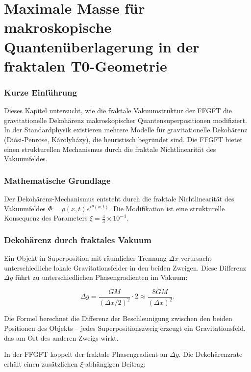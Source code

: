\chapter{Maximale Masse für makroskopische Quantenüberlagerung in der fraktalen T0-Geometrie}


	
	\subsection*{Kurze Einführung}
	
	Dieses Kapitel untersucht, wie die fraktale Vakuumstruktur der FFGFT die gravitationelle Dekohärenz makroskopischer Quantensuperpositionen modifiziert. In der Standardphysik existieren mehrere Modelle für gravitationelle Dekohärenz (Diósi-Penrose, Károlyházy), die heuristisch begründet sind. Die FFGFT bietet einen strukturellen Mechanismus durch die fraktale Nichtlinearität des Vakuumfeldes.
	
	\subsection*{Mathematische Grundlage}
	
	Der Dekohärenz-Mechanismus entsteht durch die fraktale Nichtlinearität des Vakuumfeldes \(\Phi = \rho(x,t) e^{i\theta(x,t)}\). Die Modifikation ist eine strukturelle Konsequenz des Parameters \(\xi = \frac{4}{3} \times 10^{-4}\).
	

	
	\subsection*{Dekohärenz durch fraktales Vakuum}
	
	Ein Objekt in Superposition mit räumlicher Trennung \(\Delta x\) verursacht unterschiedliche lokale Gravitationsfelder in den beiden Zweigen. Diese Differenz \(\Delta g\) führt zu unterschiedlichen Phasengradienten im Vakuum:
	
	\begin{equation}
		\Delta g = \frac{G M}{(\Delta x/2)^2} \cdot 2 \approx \frac{8 G M}{(\Delta x)^2}.
	\end{equation}
	
	Die Formel berechnet die Differenz der Beschleunigung zwischen den beiden Positionen des Objekts – jedes Superpositionszweig erzeugt ein Gravitationsfeld, das am Ort des anderen Zweigs wirkt.
	
	In der FFGFT koppelt der fraktale Phasengradient an \(\Delta g\). Die Dekohärenzrate erhält einen zusätzlichen \(\xi\)-abhängigen Beitrag:
	
